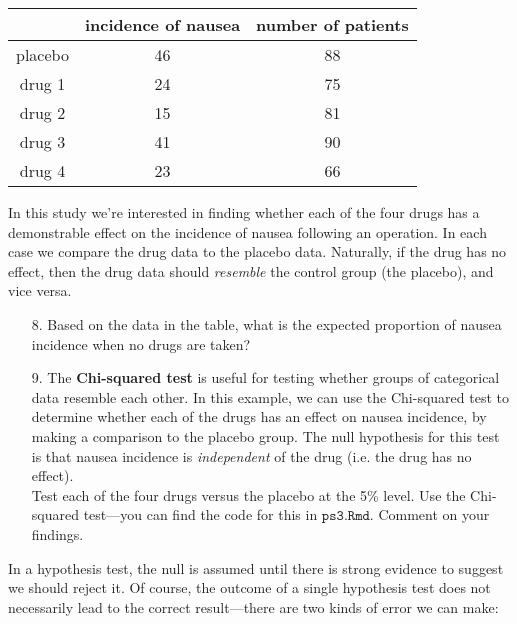 \documentclass[10pt]{extarticle}
\begin{document}
\begin{center}
        \begin{tabular}{c c c}
                \hline
                  & incidence of nausea & number of patients \\
                 \hline
                 placebo & 46 & 88 \\
                 drug 1 & 24 & 75 \\
                 drug 2 & 15 & 81 \\
		 drug 3 & 41 & 90 \\ 
		 drug 4 & 23 & 66 \\ 
                 \hline
        \end{tabular}
\end{center} 

\hfill 

In this study we're interested in finding whether each of the four drugs has a demonstrable effect on the incidence of nausea following an operation. In each case we compare the drug data to the placebo data. Naturally, if the drug has no effect, then the drug data should {\it resemble} the control group (the placebo), and vice versa.  

\hfill 

\begin{itemize}

	\item[8.] Based on the data in the table, what is the expected proportion of nausea incidence when no drugs are taken? \\ 

	\item[9.] The {\bf Chi-squared test} is useful for testing whether groups of categorical data resemble each other. In this example, we can use the Chi-squared test to determine whether each of the drugs has an effect on nausea incidence, by making a comparison to the placebo group. The null hypothesis for this test is that nausea incidence is {\it independent} of the drug (i.e. the drug has no effect). \\ 

Test each of the four drugs versus the placebo at the 5\% level. Use the Chi-squared test---you can find the code for this in $\texttt{ps3.Rmd}$. Comment on your findings.  

\end{itemize}

\hfill 

In a hypothesis test, the null is assumed until there is strong evidence to suggest we should reject it. Of course, the outcome of a single hypothesis test does not necessarily lead to the correct result---there are two kinds of error we can make: 
\end{document}
